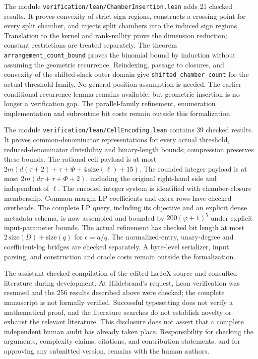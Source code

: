 \documentclass[11pt]{article}
\theoremstyle{definition}\newtheorem{definition}{Definition}[section]
\theoremstyle{remark}\newtheorem{remark}[theorem]{Remark}
\begin{document}
The module \texttt{verification/lean/ChamberInsertion.lean} adds 21 checked results. It proves convexity of strict sign regions, constructs a crossing point for every split chamber, and injects split chambers into the induced sign regions. Translation to the kernel and rank-nullity prove the dimension reduction; constant restrictions are treated separately. The theorem \texttt{arrangement\_count\_bound} proves the binomial bound by induction without assuming the geometric recurrence. Reindexing, passage to closures, and convexity of the shifted-slack outer domain give \texttt{shifted\_chamber\_count} for the actual threshold family. No general-position assumption is needed. The earlier conditional recurrence lemma remains available, but geometric insertion is no longer a verification gap. The parallel-family refinement, enumeration implementation and subroutine bit costs remain outside this formalization.

The module \texttt{verification/lean/CellEncoding.lean} contains 39 checked results. It proves common-denominator representations for every actual threshold, reduced-denominator divisibility and binary-length bounds; compression preserves these bounds. The rational cell payload is at most $2m(d(\tau+2)+\tau+\Phi+4\,\mathrm{size}(\ell)+15)$. The rounded integer payload is at most $2m(d\tau+\tau+\Phi+2)$, including the original right-hand side and independent of $\ell$. The encoded integer system is identified with chamber-closure membership. Common-margin LP coefficients and extra rows have checked overheads. The complete LP query, including its objective and an explicit dense metadata schema, is now assembled and bounded by $200(\varphi+1)^5$ under explicit input-parameter bounds. The actual refinement has checked bit length at most $2\,\mathrm{size}(D)+\mathrm{size}(q)$ for $\epsilon=a/q$. The normalized-entry, unary-degree and coefficient-log bridges are checked separately. A byte-level serializer, input parsing, and construction and oracle costs remain outside the formalization.

The assistant checked compilation of the edited \LaTeX{} source and consulted literature during development. At Hildebrand's request, Lean verification was resumed and the 256 results described above were checked; the complete manuscript is not formally verified. Successful typesetting does not verify a mathematical proof, and the literature searches do not establish novelty or exhaust the relevant literature. This disclosure does not assert that a complete independent human audit has already taken place. Responsibility for checking the arguments, complexity claims, citations, and contribution statements, and for approving any submitted version, remains with the human authors.
\end{document}
